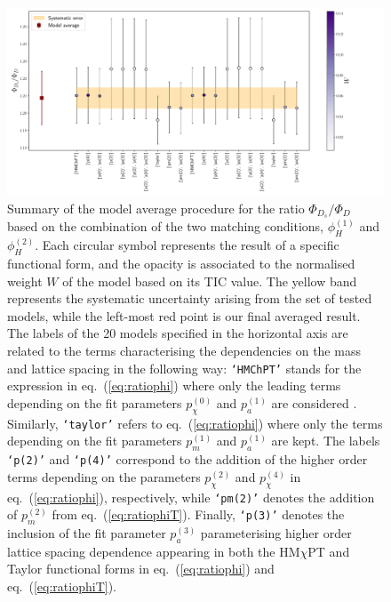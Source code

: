 \begin{figure}
	\centering
	\includegraphics[scale=0.3]{./cap6/figs/fds/cat_ave_totfds_over_fd.pdf}
	\caption{Summary of the model average procedure for the ratio $\Phi_{D_s}/\Phi_D$ based on the combination of the two matching conditions, $\phi_{H}^{(1)}$ and $\phi_{H}^{(2)}$. Each circular symbol  represents the result of a specific functional form, and the opacity is associated to the normalised weight $W$ of the model based on its TIC value. The yellow band represents the systematic uncertainty arising from the set of tested models, while the left-most red point is our final  averaged result. The labels of the 20 models specified in the horizontal axis are related to the terms characterising the dependencies on the mass and lattice spacing in the following way:  \texttt{`HMChPT'}  stands for the expression in eq.~(\ref{eq:ratiophi}) where only the leading terms depending on the fit parameters $p_\chi^{(0)}$ and $p_a^{(1)}$ are considered . Similarly,  \texttt{`taylor'} refers to eq.~(\ref{eq:ratiophi}) where only the terms depending on the fit parameters $p_m^{(1)}$ and $p_a^{(1)}$ are kept. The labels \texttt{`p(2)'} and \texttt{`p(4)'} correspond to the addition of the higher order terms depending on the parameters $p_\chi^{(2)}$ and   $p_\chi^{(4)}$ in eq.~(\ref{eq:ratiophi}), respectively, while  \texttt{`pm(2)'} denotes the addition of $p_m^{(2)}$ from eq.~(\ref{eq:ratiophiT}). Finally,  \texttt{`p(3)'}  denotes the inclusion of the fit parameter $p_a^{(3)}$ parameterising  higher order  lattice spacing dependence appearing in both the HM$\chi$PT and Taylor functional forms in eq.~(\ref{eq:ratiophi}) and eq.~(\ref{eq:ratiophiT}).
        } 
	\label{fig:fds_ratio_model_av}
\end{figure}

